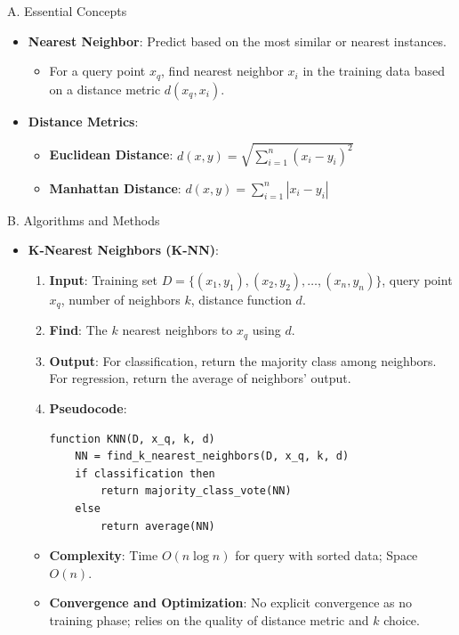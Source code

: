 \documentclass[
  12pt,
]{report}
\providecommand{\tightlist}{%
  \setlength{\itemsep}{0pt}\setlength{\parskip}{0pt}}
\begin{document}
A. Essential Concepts

\begin{itemize}
\tightlist
\item
  \textbf{Nearest Neighbor}: Predict based on the most similar or nearest instances.

  \begin{itemize}
  \tightlist
  \item
    For a query point \(x_q\), find nearest neighbor \(x_i\) in the training data based on a distance metric \(d(x_q, x_i)\).
  \end{itemize}
\item
  \textbf{Distance Metrics}:

  \begin{itemize}
  \tightlist
  \item
    \textbf{Euclidean Distance}: \(d(x, y) = \sqrt{\sum_{i=1}^n (x_i - y_i)^2}\)
  \item
    \textbf{Manhattan Distance}: \(d(x, y) = \sum_{i=1}^n |x_i - y_i|\)
  \end{itemize}
\end{itemize}

B. Algorithms and Methods

\begin{itemize}
\tightlist
\item
  \textbf{K-Nearest Neighbors (K-NN)}:

  \begin{enumerate}
  \def\labelenumi{\arabic{enumi}.}
  \item
    \textbf{Input}: Training set \(D = \{(x_1, y_1), (x_2, y_2), \ldots, (x_n, y_n)\}\), query point \(x_q\), number of neighbors \(k\), distance function \(d\).
  \item
    \textbf{Find}: The \(k\) nearest neighbors to \(x_q\) using \(d\).
  \item
    \textbf{Output}: For classification, return the majority class among neighbors. For regression, return the average of neighbors' output.
  \item
    \textbf{Pseudocode}:

\begin{verbatim}
function KNN(D, x_q, k, d)
    NN = find_k_nearest_neighbors(D, x_q, k, d)
    if classification then
        return majority_class_vote(NN)
    else
        return average(NN)
\end{verbatim}
  \end{enumerate}

  \begin{itemize}
  \tightlist
  \item
    \textbf{Complexity}: Time \(O(n \log n)\) for query with sorted data; Space \(O(n)\).
  \item
    \textbf{Convergence and Optimization}: No explicit convergence as no training phase; relies on the quality of distance metric and \(k\) choice.
  \end{itemize}
\end{itemize}
\end{document}
